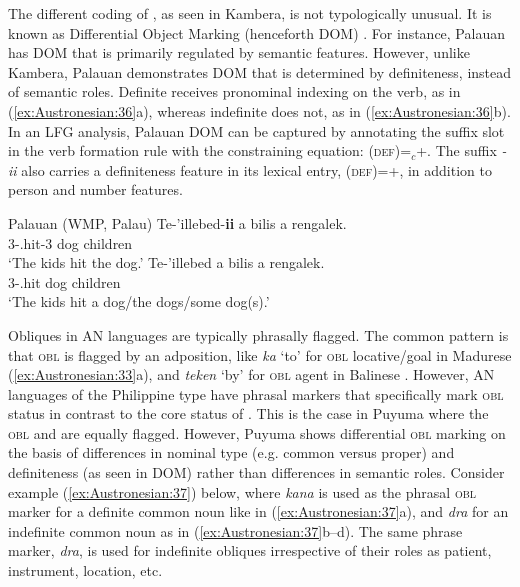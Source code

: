 \documentclass[output=paper,chinesefont]{../langscibook}
\begin{document}
The different coding of \OBJ, as seen in Kambera, is not typologically unusual. It is known as Differential Object Marking (henceforth DOM) \citep{DN}. For instance, Palauan has DOM that is primarily regulated by semantic features. However, unlike Kambera, Palauan demonstrates DOM that is determined by definiteness, instead of semantic roles. Definite \OBJ receives pronominal indexing on the verb, as in (\ref{ex:Austronesian:36}a), whereas indefinite \OBJ does not, as in (\ref{ex:Austronesian:36}b). In an LFG analysis, Palauan DOM can be captured by annotating the suffix slot in the verb formation rule with the constraining equation: (\UP\OBJ\textsc{def})=$_c$\/+. The suffix \emph{-ii} also carries a definiteness feature in its lexical entry, (\UP\textsc{def})=+, in addition to person and number features.

\ea\label{ex:Austronesian:36} Palauan (WMP, Palau)  \citep[45]{Georgopoulos1991}
\ea\gll
Te-'illebed-\textbf{ii} a bilis a rengalek.\\
 3\PL-\PFV.hit-{3\SG} {} dog {} children\\
\glt`The kids hit the dog.'
\ex\gll
Te-'illebed a bilis a rengalek.\\
3\PL-\PFV.hit {} dog {} children\\
\glt`The kids hit a dog/the dogs/some dog(s).'
\z\z

Obliques in AN languages are typically phrasally flagged. The common pattern is that \textsc{obl} is flagged by an adposition, like \emph{ka} `to' for \textsc{obl} locative/goal in Madurese (\ref{ex:Austronesian:33}a), and \emph{teken} `by' for \textsc{obl} agent in Balinese \citep[262]{Arka2019}. However, AN languages of the Philippine type have phrasal markers that specifically mark \textsc{obl} status in contrast to the core status of \SUBJ. This is the case in Puyuma where the \textsc{obl} and \SUBJ are equally flagged. However, Puyuma shows differential \textsc{obl} marking on the basis of differences in nominal type (e.g. common versus proper) and definiteness (as seen in DOM) rather than differences in semantic roles. Consider example (\ref{ex:Austronesian:37}) below, where \emph{kana} is used as the phrasal \textsc{obl} marker for a definite common noun like in (\ref{ex:Austronesian:37}a), and \emph{dra} for an indefinite common noun as in (\ref{ex:Austronesian:37}b--d). The same phrase marker, \emph{dra}, is used for indefinite obliques irrespective of their roles as patient, instrument, location, etc.
\end{document}
